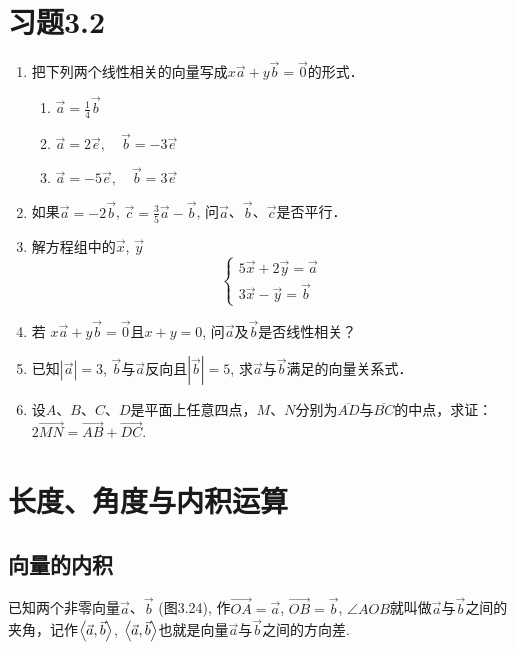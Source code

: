 \section*{习题3.2}

\begin{enumerate}
    \item 把下列两个线性相关的向量写成$x\vec{a}+y\vec{b}=\vec{0}$的形式．
\begin{multicols}{3}
\begin{enumerate}
    \item $\vec{a}=\frac{1}{4}\vec{b}$
    \item $\vec{a}=2\vec{e},\quad \vec{b}=-3\vec{e}$
    \item $\vec{a}=-5\vec{e},\quad \vec{b}=3\vec{e}$
\end{enumerate}
\end{multicols}
\item 如果$\vec{a}=-2\vec{b}$, $\vec{c}=\frac{3}{5}\vec{a}-\vec{b}$, 问$\vec{a}$、$\vec{b}$、$\vec{c}$是否平行．
\item 解方程组中的$\vec{x}$, $\vec{y}$
\[\begin{cases}
    5\vec{x}+2\vec{y}=\vec{a}\\
    3\vec{x}-\vec{y}=\vec{b}
\end{cases}\]
\item 若 $x\vec{a}+y\vec{b}=\vec{0}$且$x+y=0$, 问$\vec{a}$及$\vec{b}$是否线性相关？
\item 已知$|\vec{a}|=3$, $\vec{b}$与$\vec{a}$反向且$|\vec{b}|=5$, 求$\vec{a}$与$\vec{b}$满足的向量关系式．
\item 设$A$、$B$、$C$、$D$是平面上任意四点，$M$、$N$分别为$\overline{AD}$与$\overline{BC}$的中点，求证：$2\Vec{MN}=\Vec{AB}+\Vec{DC}$.
\end{enumerate}

\section{长度、角度与内积运算}
\subsection{向量的内积}

已知两个非零向量$\vec{a}$、$\vec{b}$ (图3.24), 作$\Vec{OA}=\vec{a}$, $\Vec{OB}=\vec{b}$, $\angle AOB$就叫做$\vec{a}$与$\vec{b}$之间的夹角，记作$\left\langle \vec{a},\vec{b} \right\rangle$, $\left\langle \vec{a},\vec{b} \right\rangle$也就是向量$\vec{a}$与$\vec{b}$之间的方向差.

